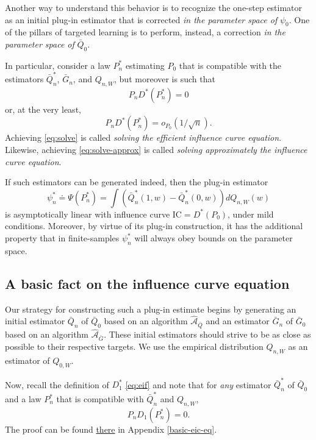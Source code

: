 \documentclass[11pt,openright,twoside]{book}
\newcommand{\Algo}{\widehat{\mathcal{A}}}
\newcommand{\defq}{\doteq}
\newcommand{\IC}{\textrm{IC}}
\newcommand{\Gbar}{\bar{G}}
\newcommand{\Qbar}{\bar{Q}}
\theoremstyle{definition}
\theoremstyle{definition}
\theoremstyle{definition}
\theoremstyle{remark}
\begin{document}
Another way to understand this behavior is to recognize the one-step estimator
as an initial plug-in estimator that is corrected \emph{in the parameter space of}
\(\psi_0\). One of the pillars of targeted learning is to perform, instead, a
correction \emph{in the parameter space of} \(\Qbar_0\).

In particular, consider a law \(P_{n}^{*}\) estimating \(P_{0}\) that is
compatible with the estimators \(\Qbar_n^*\), \(\Gbar_n\), and \(Q_{n,W}\), but
moreover is such that
\begin{equation} 
P_n  D^*(P_{n}^*)  = 0 \label{eq:solve}
\end{equation}
or, at the very least,
\begin{equation} 
P_n D^*(P_{n}^*) = o_{P_0}(1/\sqrt{n}). \label{eq:solve-approx} 
\end{equation}
Achieving \eqref{eq:solve} is called \emph{solving the efficient influence curve
equation}. Likewise, achieving \eqref{eq:solve-approx} is called \emph{solving
approximately the influence curve equation}.

If such estimators can be generated indeed, then the plug-in estimator
\begin{equation*}     \psi_n^*    \defq     \Psi(P_{n}^{*})    =     \int
\left(\Qbar_n^*(1,w)  - \Qbar_n^*(0,w)\right)  dQ_{n,W}(w) \end{equation*} is
asymptotically linear with influence curve \(\IC = D^{*}(P_{0})\), under mild
conditions. Moreover, by virtue of its plug-in construction, it has the
additional property that in finite-samples \(\psi_n^*\) will always obey bounds
on the parameter space.

\hypertarget{basic-fact}{%
\subsection{A basic fact on the influence curve equation}\label{basic-fact}}

Our strategy for constructing such a plug-in estimate begins by generating an
initial estimator \(\Qbar_n\) of \(\Qbar_0\) based on an algorithm \(\Algo_{\Qbar}\)
and an estimator \(\Gbar_n\) of \(\Gbar_0\) based on an algorithm \(\Algo_{\Gbar}\).
These initial estimators should strive to be as close as possible to their
respective targets. We use the empirical distribution \(Q_{n,W}\) as an
estimator of \(Q_{0,W}\).

Now, recall the definition of \(D_{1}^{*}\) \eqref{eq:eif} and note that for
\emph{any} estimator \(\Qbar_n^*\) of \(\Qbar_0\) and a law \(P_n^{*}\) that is
compatible with \(\Qbar_n^*\) and \(Q_{n,W}\), \begin{equation*}  P_{n}  D_{1}
(P_{n}^{*}) = 0.
\end{equation*}
The proof can be found \protect\hyperlink{basic-eic-eq}{there} in Appendix \ref{basic-eic-eq}.
\end{document}
